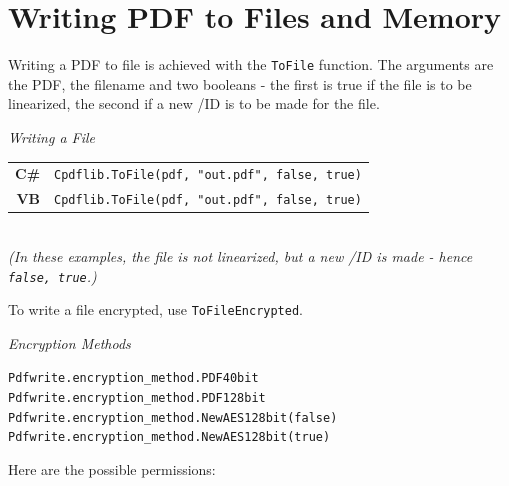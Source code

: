 \documentclass[a4paper]{memoir}
\begin{document}
\section{Writing PDF to Files and Memory}
Writing a PDF to file is achieved with the \verb!ToFile! function. The arguments are the PDF, the filename and two booleans - the first is true if the file is to be linearized, the second if a new /ID is to be made for the file.
\begin{framed}
\noindent\textit{Writing a File}\\

\noindent\begin{tabular}{rl}
\small\sffamily\textbf{C\#} &
\begin{minipage}{4in}
\small\verb!Cpdflib.ToFile(pdf, "out.pdf", false, true)!
\end{minipage}\\[5mm]
\small\sffamily\textbf{VB} &
\begin{minipage}{4in}
\small\verb!Cpdflib.ToFile(pdf, "out.pdf", false, true)!
\end{minipage}\\[5mm]
\end{tabular}\\

\noindent\textit{(In these examples, the file is not linearized, but a new /ID is made - hence \texttt{false, true}.)}
\end{framed}

To write a file encrypted, use \verb!ToFileEncrypted!.

\begin{framed}
\noindent\textit{Encryption Methods}

\vspace{2mm}
\noindent\small\verb!Pdfwrite.encryption_method.PDF40bit!\\
\small\verb!Pdfwrite.encryption_method.PDF128bit!\\
\small\verb!Pdfwrite.encryption_method.NewAES128bit(false)!\\
\small\verb!Pdfwrite.encryption_method.NewAES128bit(true)!
\end{framed}
Here are the possible permissions:
\end{document}
